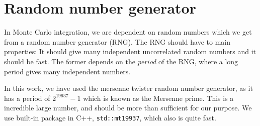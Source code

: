 \section{Random number generator}
In Monte Carlo integration, we are dependent on random numbers which we get from a random number generator (RNG). The RNG should have to main properties: It should give many independent uncorrelated random numbers and it should be fast. The former depends on the \textit{period} of the RNG, where a long period gives many independent numbers. 

In this work, we have used the mersenne twister random number generator, as it has a period of $2^{19937}-1$ which is known as the Mersenne prime. This is a incredible large number, and should be more than sufficient for our purpose. We use built-in package in C++, \lstinline|std::mt19937|, which also is quite fast.